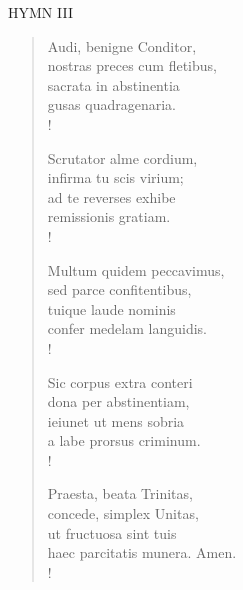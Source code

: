 \noindent\small{\uppercase{Hymn III}}\normalsize\label{lent:lastHymn}
\begin{verse}
Audi, benigne Conditor,\\
nostras preces cum fletibus,\\
sacrata in abstinentia\\
gusas quadragenaria.\\!

Scrutator alme cordium,\\
infirma tu scis virium;\\
ad te reverses exhibe\\
remissionis gratiam.\\!

Multum quidem peccavimus,\\
sed parce confitentibus,\\
tuique laude nominis\\
confer medelam languidis.\\!

Sic corpus extra conteri\\
dona per abstinentiam,\\
ieiunet ut mens sobria\\
a labe prorsus criminum.\\!

Praesta, beata Trinitas,\\
concede, simplex Unitas,\\
ut fructuosa sint tuis\\
haec parcitatis munera. Amen.\\!
\end{verse}

